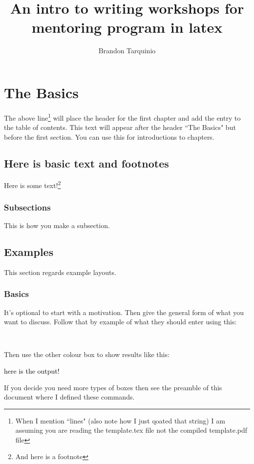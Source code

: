 \documentclass{book}
\newcommand{\examplein}[1]{\begin{center} \colorbox{Dark}{\textcolor{white}{#1}} \end{center}}
\newcommand{\exampleout}[1]{\begin{center} \colorbox{Light}{\textcolor{black}{#1}} \end{center}}
\begin{document}
\title{An intro to writing workshops for mentoring program in latex}
\author{Brandon Tarquinio}

\maketitle
\tableofcontents
\newpage
\chapter{The Basics}
The above line\footnote{When I mention ``lines" (also note how I just qoated that string) I am assuming you are reading the template.tex file not the compiled template.pdf file} will place the header for the first chapter and add the entry to the table of contents. This text will appear after the header ``The Basics" but before the first section. You can use this for introductions to chapters. 
\section{Here is basic text and footnotes}
Here is some text!\footnote{And here is a footnote}
\subsection{Subsections}
This is how you make a subsection.


\section{Examples}
This section regards example layouts.
\subsection{Basics}
It's optional to start with a motivation. Then give the general form of what you want to discuss. Follow that by example of what they should enter using this:
\examplein{head -v --lines=20 myfile}
Then use the other colour box to show results like this:
\exampleout{here is the output!}
If you decide you need more types of boxes then see the preamble of this document where I defined these commands.
\end{document}
